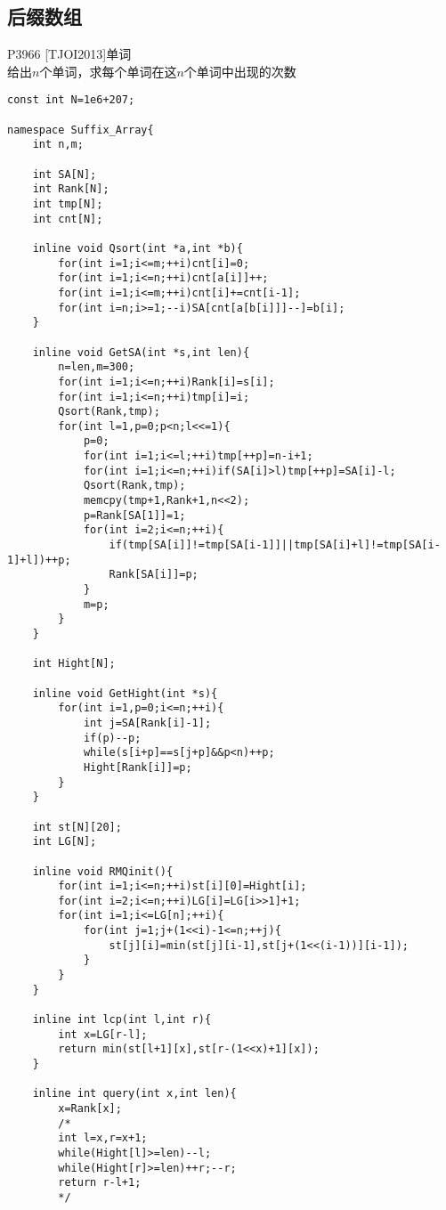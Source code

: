 \documentclass{ctexart}
\begin{document}
\subsection{后缀数组}
P3966 [TJOI2013]单词\\
给出$n$个单词，求每个单词在这$n$个单词中出现的次数
\begin{lstlisting}
const int N=1e6+207;

namespace Suffix_Array{
    int n,m;
    
    int SA[N];
    int Rank[N];
    int tmp[N];
    int cnt[N];
    
    inline void Qsort(int *a,int *b){
        for(int i=1;i<=m;++i)cnt[i]=0;
        for(int i=1;i<=n;++i)cnt[a[i]]++;
        for(int i=1;i<=m;++i)cnt[i]+=cnt[i-1];
        for(int i=n;i>=1;--i)SA[cnt[a[b[i]]]--]=b[i];
    }
    
    inline void GetSA(int *s,int len){
        n=len,m=300;
        for(int i=1;i<=n;++i)Rank[i]=s[i];
        for(int i=1;i<=n;++i)tmp[i]=i;
        Qsort(Rank,tmp);
        for(int l=1,p=0;p<n;l<<=1){
            p=0;
            for(int i=1;i<=l;++i)tmp[++p]=n-i+1;
            for(int i=1;i<=n;++i)if(SA[i]>l)tmp[++p]=SA[i]-l;
            Qsort(Rank,tmp);
            memcpy(tmp+1,Rank+1,n<<2);
            p=Rank[SA[1]]=1;
            for(int i=2;i<=n;++i){
                if(tmp[SA[i]]!=tmp[SA[i-1]]||tmp[SA[i]+l]!=tmp[SA[i-1]+l])++p;
                Rank[SA[i]]=p;
            }
            m=p;
        }
    }
    
    int Hight[N];
    
    inline void GetHight(int *s){
        for(int i=1,p=0;i<=n;++i){
            int j=SA[Rank[i]-1];
            if(p)--p;
            while(s[i+p]==s[j+p]&&p<n)++p;
            Hight[Rank[i]]=p;
        }
    }
    
    int st[N][20];
    int LG[N];
    
    inline void RMQinit(){
        for(int i=1;i<=n;++i)st[i][0]=Hight[i];
        for(int i=2;i<=n;++i)LG[i]=LG[i>>1]+1;
        for(int i=1;i<=LG[n];++i){
            for(int j=1;j+(1<<i)-1<=n;++j){
                st[j][i]=min(st[j][i-1],st[j+(1<<(i-1))][i-1]);
            }
        }
    }
    
    inline int lcp(int l,int r){
        int x=LG[r-l];
        return min(st[l+1][x],st[r-(1<<x)+1][x]);
    }
    
    inline int query(int x,int len){
        x=Rank[x];
        /*
        int l=x,r=x+1;
        while(Hight[l]>=len)--l;
        while(Hight[r]>=len)++r;--r;
        return r-l+1;
        */
        

\end{lstlisting}
\end{document}
